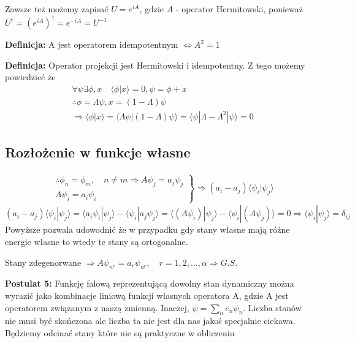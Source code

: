 Zawsze też możemy zapisać $U = e^{iA}$, gdzie $A$ - operator Hermitowski, ponieważ \newline $U^{\dagger} = (e^{iA})^{\dagger} = e^{-iA} = U^{-1} $

\textbf{Definicja:} A jest operatorem idempotentnym $\iff A^2 = 1$

\textbf{Definicja:} Operator projekcji jest Hermitowski i idempotentny.
Z tego możemy powiedzieć że 
\begin{equation*}
	\begin{split}
		&\forall \psi \exists \phi, x \quad \langle \phi | x \rangle = 0, \psi = \phi + x \\
		&\therefore \phi = \Lambda \psi, x = (1 - \Lambda) \psi  \\
		&\Rightarrow \langle \phi | x \rangle = \langle \Lambda \psi | (1 - \Lambda) \psi \rangle =  \langle  \psi | \Lambda - \Lambda^2 | \psi \rangle = 0 
	\end{split}
\end{equation*}
\subsection{Rozłożenie w funkcje własne}
\begin{align*}
	&\left.
	\begin{aligned}
		\therefore \phi_n = \phi_m, \quad n \neq m \Rightarrow A \psi_j = a_j \psi_j \\
		A \psi_i = a_i \psi_i
	\end{aligned}
	\right\}
	\Rightarrow (a_i - a_j)\langle \psi_i | \psi_j \rangle 
\end{align*}
\begin{equation}
	(a_i - a_j)\langle \psi_i | \psi_j \rangle  = \langle a_i \psi_i | \psi_j \rangle - \langle \psi_i | a_j \psi_j \rangle = \langle (A \psi_i) | \psi_j \rangle - \langle \psi_i | (A \psi_j) \rangle = 0 \Rightarrow \langle \psi_i | \psi_j \rangle = \delta_{ij}
\end{equation}
Powyższe pozwala udowodnić że w przypadku gdy stany własne mają różne energie własne to wtedy te stany są ortogonalne.

Stany zdegenorwane $\Rightarrow A\psi_{n^r} = a_r \psi_{n^r}, \quad r = 1, 2, \dots, \alpha \Rightarrow G.S. $

\textbf{Postulat 5:} Funkcję falową reprezentującą dowolny stan dynamiczny można wyrazić jako kombinacje liniową funkcji własnych operatora A, gdzie A jest operatorem związanym z naszą zmienną. Inaczej, $\psi = \sum_n e_n \psi_n$. Liczba stanów nie musi być skończona ale liczba ta nie jest dla nas jakoś specjalnie ciekawa. Będziemy odcinać stany które nie są praktyczne w obliczeniu

